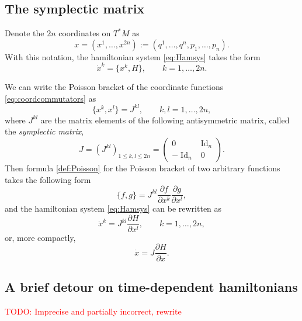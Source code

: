 \documentclass[english,fontsize=11pt,paper=b5]{scrbook}
\DeclareMathOperator{\Id}{Id}
\DeclareMathOperator{\Id}{Id}
\theoremstyle{definition}
\begin{document}
    \subsection{The symplectic matrix}\label{sec:symplmat}
    Denote the $2n$ coordinates on $T^*M$ as
    \begin{equation}
      x=(x^1, \ldots, x^{2n}) := (q^1, \ldots, q^n, p_1, \ldots, p_n).
    \end{equation}
    With this notation, the hamiltonian system \eqref{eq:Hamsys} takes the form
    \begin{equation}
      \dot x^k = \big\{x^k, H\big\}, \qquad k=1,\ldots,2n.
    \end{equation}

    We can write the Poisson bracket of the coordinate functions \eqref{eq:coordcommutators} as
    \begin{equation}
      \big\{x^k, x^l\big\} = J^{kl}, \qquad k,l = 1,\ldots,2n,
    \end{equation}
    where $J^{kl}$ are the matrix elements of the following antisymmetric matrix, called the \emph{symplectic matrix},
    \begin{equation}\label{eq:symmat}
      J = \left(J^{kl}\right)_{1\leq k,l\leq2n} = \begin{pmatrix}0 & \Id_n \\ -\Id_n & 0\end{pmatrix}.
    \end{equation}
    Then formula \eqref{def:Poisson} for the Poisson bracket of two arbitrary functions takes the following form
    \begin{equation}\label{eq:coordPB}
      \big\{f,g\big\} = J^{kl} \frac{\partial f}{\partial x^k}\frac{\partial g}{\partial x^l},
    \end{equation}
    and the hamiltonian system \eqref{eq:Hamsys} can be rewritten as
    \begin{equation}
      \dot x^k = J^{kl} \frac{\partial H}{\partial x^l}, \qquad k=1,\ldots,2n,
    \end{equation}
    or, more compactly,
    \begin{equation}\label{eq:hamsysJ}
      \dot x = J \frac{\partial H}{\partial x}.
    \end{equation}

    \subsection{A brief detour on time-dependent hamiltonians}\label{sec:timedepH}
    \textcolor{red}{TODO: Imprecise and partially incorrect, rewrite}
\end{document}
